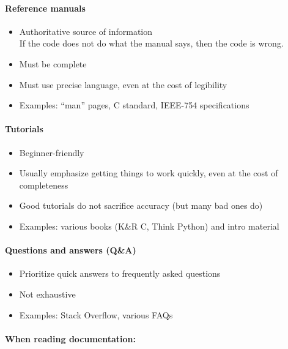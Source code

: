 \documentclass[12pt]{article}
\begin{document}
\paragraph{Reference manuals}
\begin{itemize}
    \item Authoritative source of information \\
    If the code does not do what the manual says, then the code is wrong.
    
    \item Must be complete
    
    \item Must use precise language, even at the cost of legibility
    
    \item Examples: ``man'' pages, C standard, IEEE-754 specifications
\end{itemize}

\paragraph{Tutorials}
\begin{itemize}
    \item Beginner-friendly
    
    \item Usually emphasize getting things to work quickly, even at the cost of completeness
    
    \item Good tutorials do not sacrifice accuracy (but many bad ones do)
    
    \item Examples: various books (K\&R C, Think Python) and intro material
\end{itemize}

\paragraph{Questions and answers (Q\&A)}
\begin{itemize}
    \item Prioritize quick answers to frequently asked questions
    
    \item Not exhaustive
    
    \item Examples: Stack Overflow, various FAQs
\end{itemize}
\paragraph{When reading documentation:}
\end{document}
